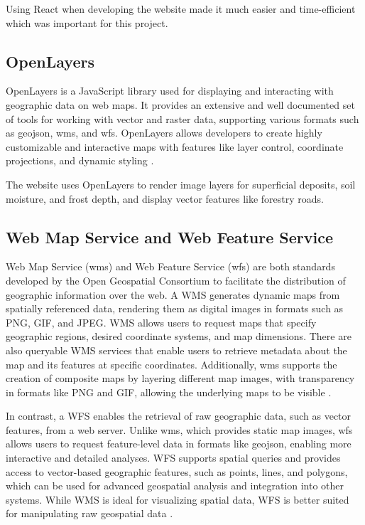 Using React when developing the website made it much easier and time-efficient which was important for this project. 

\subsection{OpenLayers}

OpenLayers is a JavaScript library used for displaying and interacting with geographic data on web maps. It provides an extensive and well documented set of tools for working with vector and raster data, supporting various formats such as \Gls{geojson}, \Gls{wms}, and \Gls{wfs}. OpenLayers allows developers to create highly customizable and interactive maps with features like layer control, coordinate projections, and dynamic styling \cite{openlayers}.

The website uses OpenLayers to render image layers for \gls{superficial deposit}s, soil moisture, and \gls{frost} depth, and display vector features like forestry roads.  

\subsection{Web Map Service and Web Feature Service}

Web Map Service (\Gls{wms}) and Web Feature Service (\Gls{wfs}) are both standards developed by the Open Geospatial Consortium to facilitate the distribution of geographic information over the web. A WMS generates dynamic maps from spatially referenced data, rendering them as digital images in formats such as PNG, GIF, and JPEG. WMS allows users to request maps that specify geographic regions, desired coordinate systems, and map dimensions. There are also queryable WMS services that enable users to retrieve metadata about the map and its features at specific coordinates. Additionally, \Gls{wms} supports the creation of composite maps by layering different map images, with transparency in formats like PNG and GIF, allowing the underlying maps to be visible \cite{ogc2006wms}.

In contrast, a WFS enables the retrieval of raw geographic data, such as vector features, from a web server. Unlike \Gls{wms}, which provides static map images, \Gls{wfs} allows users to request feature-level data in formats like \Gls{geojson}, enabling more interactive and detailed analyses. WFS supports spatial queries and provides access to vector-based geographic features, such as points, lines, and polygons, which can be used for advanced geospatial analysis and integration into other systems. While WMS is ideal for visualizing spatial data, WFS is better suited for manipulating raw geospatial data \cite{ogc2005wfs}.

